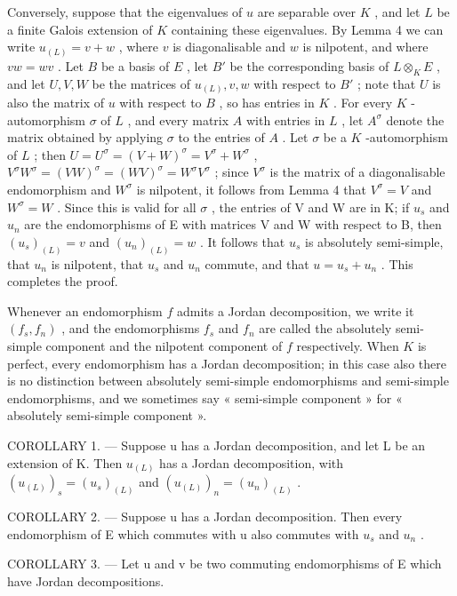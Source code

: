 Conversely, suppose that the eigenvalues of \(u\) are separable over \(K\) , and let \(L\) be a finite Galois extension of \(K\) containing these eigenvalues. By Lemma 4 we can write \(u_{(L)} = v + w\) , where \(v\) is diagonalisable and \(w\) is nilpotent, and where \(vw = wv\) . Let \(B\) be a basis of \(E\) , let \(B'\) be the corresponding basis of \(L \otimes_K E\) , and let \(U, V, W\) be the matrices of \(u_{(L)}, v, w\) with respect to \(B'\) ; note that \(U\) is also the matrix of \(u\) with respect to \(B\) , so has entries in \(K\) . For every \(K\) -automorphism \(\sigma\) of \(L\) , and every matrix \(A\) with entries in \(L\) , let \(A^\sigma\) denote the matrix obtained by applying \(\sigma\) to the entries of \(A\) . Let \(\sigma\) be a \(K\) -automorphism of \(L\) ; then \(U = U^\sigma = (V + W)^\sigma = V^\sigma + W^\sigma\) , \(V^\sigma W^\sigma = (VW)^\sigma = (WV)^\sigma = W^\sigma V^\sigma\) ; since \(V^\sigma\) is the matrix of a diagonalisable endomorphism and \(W^\sigma\) is nilpotent, it follows from Lemma 4 that \(V^\sigma = V\) and \(W^\sigma = W\) . Since this is valid for all \(\sigma\) , the entries of V and W are in K; if \(u_{s}\) and \(u_{n}\) are the endomorphisms of E with matrices V and W with respect to B, then \((u_{s})_{(L)} = v\) and \((u_{n})_{(L)} = w\) . It follows that \(u_{s}\) is absolutely semi-simple, that \(u_{n}\) is nilpotent, that \(u_{s}\) and \(u_{n}\) commute, and that \(u = u_{s} + u_{n}\) . This completes the proof.

Whenever an endomorphism \(f\) admits a Jordan decomposition, we write it \((f_s, f_n)\) , and the endomorphisms \(f_s\) and \(f_n\) are called the absolutely semi-simple component and the nilpotent component of \(f\) respectively. When \(K\) is perfect, every endomorphism has a Jordan decomposition; in this case also there is no distinction between absolutely semi-simple endomorphisms and semi-simple endomorphisms, and we sometimes say « semi-simple component » for « absolutely semi-simple component ».

COROLLARY 1. --- Suppose u has a Jordan decomposition, and let L be an extension of K. Then \(u_{(L)}\) has a Jordan decomposition, with \((u_{(L)})_{s} = (u_{s})_{(L)}\) and \((u_{(L)})_{n} = (u_{n})_{(L)}\) .

COROLLARY 2. --- Suppose u has a Jordan decomposition. Then every endomorphism of E which commutes with u also commutes with \(u_{s}\) and \(u_{n}\) .

COROLLARY 3. --- Let u and v be two commuting endomorphisms of E which have Jordan decompositions.

